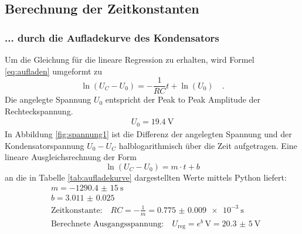 
\subsection{Berechnung der Zeitkonstanten}
\subsubsection{... durch die Aufladekurve des Kondensators}
Um die Gleichung für die lineare Regression zu erhalten, wird Formel \eqref{eq:aufladen} umgeformt zu
\begin{equation}
\ln(U_C - U_0) = -\frac{1}{RC} t + \ln(U_0) \quad .
\end{equation}
Die angelegte Spannung $U_0$ entspricht der Peak to Peak Amplitude der Rechteckspannung.
\begin{align*}
	U_0 = \SI{19.4}{\volt}
\end{align*}
In Abbildung \ref{fig:spannung1} ist die Differenz der angelegten Spannung und der Kondensatorspannung $U_0 - U_C$ halblogarithmisch über die Zeit aufgetragen. Eine lineare Ausgleichsrechnung der Form
\begin{equation}
\ln(U_C - U_0) = m \cdot t + b
\end{equation} an die in Tabelle \ref{tab:aufladekurve} dargestellten Werte mittels Python liefert:
\begin{align}
	&m = \SI{-1290.4(150)}{\second} \\
	&b = \num{3.011(25)} \\
	&\text{Zeitkonstante:} \quad RC = - \frac{1}{m} = \SI{0.775(9)e-3}{\second} \\
	&\text{Berechnete Ausgangsspannung:} \quad U_{\text{reg}} = e ^b \, \si{\volt} = \SI{20,3(5)}{\volt} \label{eq:u_reg}
\end{align}

